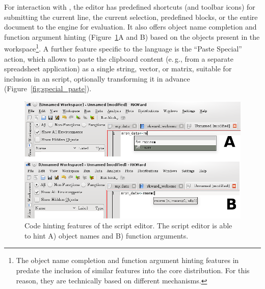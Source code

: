 For interaction with , the editor has
predefined shortcuts (and toolbar icons) for submitting the current line, the current 
selection, predefined blocks, or the entire document to the
 engine for evaluation. It also 
offers object name completion and function argument hinting 
(Figure~\ref{fig:code_hinting}A and B) based on the objects present in
the  workspace\footnote{The object name
completion and function argument hinting features in  predate the
inclusion of similar features into the core
 distribution. For this reason, they are
technically based on different mechanisms.}. A further feature specific
to the  language is the
``Paste Special'' action, which allows to
paste the clipboard content (e.\,g., from a separate spreadsheet
application) as a single string, vector, or matrix, suitable
for inclusion in an  script, optionally
transforming it in advance (Figure~\ref{fig:special_paste}).

\begin{figure}[t!]
 \centering
 \includegraphics[width=15.5cm]{./figures/code_hinting.png}
 \caption{Code hinting features of the script editor. The script editor is able to hint A)  object names
and B) function arguments.}
 \label{fig:code_hinting}
\end{figure}


